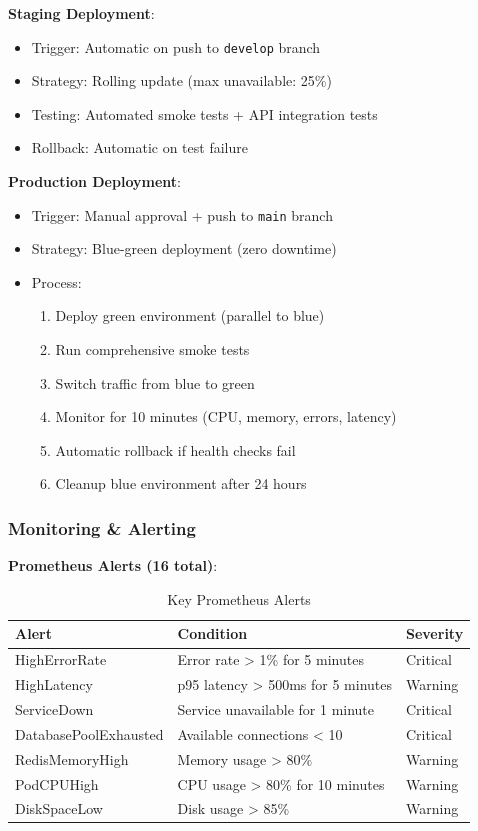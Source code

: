 \documentclass[11pt,letterpaper]{article}
\begin{document}
\textbf{Staging Deployment}:
\begin{itemize}[noitemsep]
    \item Trigger: Automatic on push to \texttt{develop} branch
    \item Strategy: Rolling update (max unavailable: 25\%)
    \item Testing: Automated smoke tests + API integration tests
    \item Rollback: Automatic on test failure
\end{itemize}

\textbf{Production Deployment}:
\begin{itemize}[noitemsep]
    \item Trigger: Manual approval + push to \texttt{main} branch
    \item Strategy: Blue-green deployment (zero downtime)
    \item Process:
    \begin{enumerate}
        \item Deploy green environment (parallel to blue)
        \item Run comprehensive smoke tests
        \item Switch traffic from blue to green
        \item Monitor for 10 minutes (CPU, memory, errors, latency)
        \item Automatic rollback if health checks fail
        \item Cleanup blue environment after 24 hours
    \end{enumerate}
\end{itemize}

\subsubsection{Monitoring \& Alerting}

\textbf{Prometheus Alerts (16 total)}:

\begin{table}[H]
\centering
\small
\begin{tabularx}{\textwidth}{lXl}
\toprule
\textbf{Alert} & \textbf{Condition} & \textbf{Severity} \\
\midrule
HighErrorRate & Error rate > 1\% for 5 minutes & Critical \\
HighLatency & p95 latency > 500ms for 5 minutes & Warning \\
ServiceDown & Service unavailable for 1 minute & Critical \\
DatabasePoolExhausted & Available connections < 10 & Critical \\
RedisMemoryHigh & Memory usage > 80\% & Warning \\
PodCPUHigh & CPU usage > 80\% for 10 minutes & Warning \\
DiskSpaceLow & Disk usage > 85\% & Warning \\
\bottomrule
\end{tabularx}
\caption{Key Prometheus Alerts}
\end{table}
\end{document}
